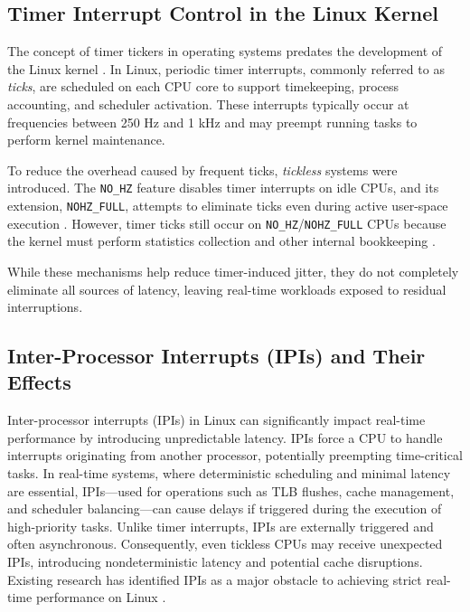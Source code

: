 \documentclass[letterpaper]{article}
\begin{document}
\subsection{Timer Interrupt Control in the Linux Kernel}

The concept of timer tickers in operating systems predates the development of the Linux kernel \cite{Corbet}. 
In Linux, periodic timer interrupts, commonly referred to as \emph{ticks}, are scheduled on each CPU core 
to support timekeeping, process accounting, and scheduler activation. These interrupts typically occur at 
frequencies between 250 Hz and 1 kHz and may preempt running tasks to perform kernel maintenance.  

To reduce the overhead caused by frequent ticks, \emph{tickless} systems were introduced. 
The \texttt{NO\_HZ} feature disables timer interrupts on idle CPUs, and its extension, 
\texttt{NOHZ\_FULL}, attempts to eliminate ticks even during active user-space execution \cite{KernelDocNOHZ}. 
However, timer ticks still occur on \texttt{NO\_HZ}/\texttt{NOHZ\_FULL} CPUs because the kernel must perform 
statistics collection and other internal bookkeeping \cite{stackoverflow}.  

While these mechanisms help reduce timer-induced jitter, they do not completely eliminate all sources of latency, 
leaving real-time workloads exposed to residual interruptions.


\subsection{Inter-Processor Interrupts (IPIs) and Their Effects}

Inter-processor interrupts (IPIs) in Linux can significantly impact real-time performance by introducing 
unpredictable latency. IPIs force a CPU to handle interrupts originating from another processor, 
potentially preempting time-critical tasks. In real-time systems, where deterministic scheduling and 
minimal latency are essential, IPIs—used for operations such as TLB flushes, cache management, 
and scheduler balancing—can cause delays if triggered during the execution of high-priority tasks. 
Unlike timer interrupts, IPIs are externally triggered and often asynchronous. Consequently, even 
tickless CPUs may receive unexpected IPIs, introducing nondeterministic latency and potential cache 
disruptions. Existing research has identified IPIs as a major obstacle to achieving strict real-time 
performance on Linux \cite{YuxinRen}.  
\end{document}
